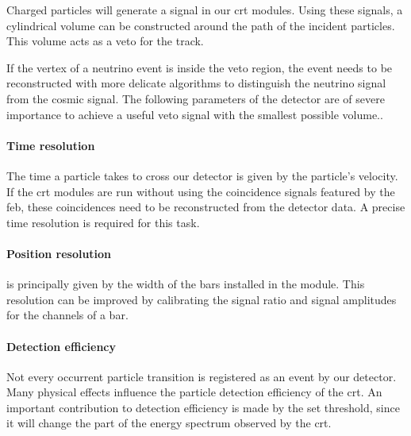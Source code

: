 Charged particles will generate a signal in our \gls{crt} modules.
Using these signals, a cylindrical volume can be constructed around the path of the incident particles.
This volume acts as a veto for the track.

If the vertex of a neutrino event is inside the veto region, the event needs to be reconstructed with more delicate algorithms to distinguish the neutrino signal from the cosmic signal.
The following parameters of the detector are of severe importance to achieve a useful veto signal with the smallest possible volume..

\paragraph{Time resolution} The time a particle takes to cross our detector is given by the particle's velocity.
If the \gls{crt} modules are run without using the coincidence signals featured by the \gls{feb}, these coincidences need to be reconstructed from the detector data.
A precise time resolution is required for this task.

\paragraph{Position resolution} is principally given by the width of the bars installed in the module.
This resolution can be improved by calibrating the signal ratio and signal amplitudes for the channels of a bar.

\paragraph{Detection efficiency} Not every occurrent particle transition is registered as an event by our detector.
Many physical effects influence the particle detection efficiency of the \gls{crt}.
An important contribution to detection efficiency is made by the set threshold, since it will change the part of the energy spectrum observed by the \gls{crt}.
